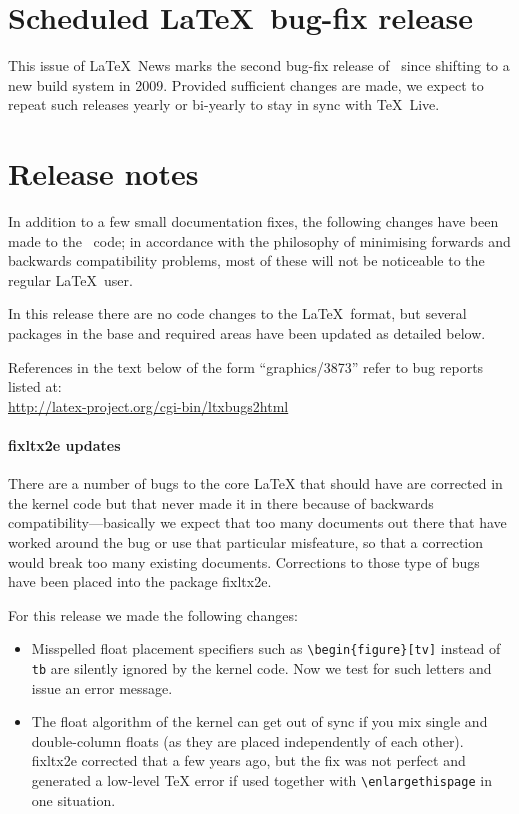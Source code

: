 \documentclass{ltnews}
\begin{document}
\maketitle

\section{Scheduled \LaTeX\ bug-fix release}

This issue of \LaTeX~News marks the second bug-fix release of
\LaTeXe\ since shifting to a new build system in 2009.
Provided sufficient changes are made, we expect to
repeat such releases yearly or bi-yearly to stay in sync with \TeX\ Live.




\section{Release notes}

In addition to a few small documentation fixes, the following changes
have been made to the \LaTeXe\ code; in accordance with the philosophy
of minimising forwards and backwards compatibility problems, most of
these will not be noticeable to the regular \LaTeX\ user. 

In this release there are no code changes to the \LaTeX\ format, but
several packages in the base and   required areas have been updated as
detailed below.

References in the text below of the form ``graphics/3873'' refer to
bug reports listed
at:\\ \url{http://latex-project.org/cgi-bin/ltxbugs2html}


\paragraph{\textsf{fixltx2e} updates}

There are a number of bugs to the core \LaTeX{} that should have are
corrected in the kernel code but that never made it in there because
of backwards compatibility---basically we expect that too many
documents out there that have worked around the bug or use that
particular misfeature, so that a correction would break too many
existing documents. Corrections to those type of bugs have been placed
into the package \textsf{fixltx2e}.
 

For this release we made the following changes:
\begin{itemize}
\item
   Misspelled float placement specifiers such as
   \verb=\begin{figure}[tv]= instead of \texttt{tb} are silently
   ignored by the kernel code.  Now we test for such letters and issue
   an error message.
\item
   The float algorithm of the kernel can get out of sync if you mix
   single and double-column floats (as they are placed independently
   of each other). \textsf{fixltx2e} corrected that a few years ago,
   but the fix was not perfect and generated a low-level \TeX{} error
   if used together with \verb=\enlargethispage= in one situation.
\end{itemize}
\end{document}

